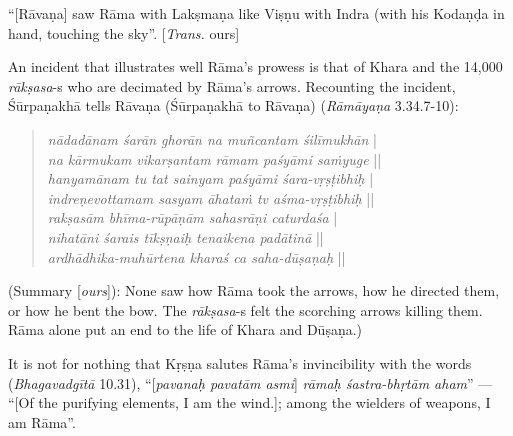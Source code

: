 \begin{myquote}
“[Rāvaṇa] saw Rāma with Lakṣmaṇa like Viṣṇu with Indra (with his Kodaṇḍa in hand, touching the sky”. [{\sl Trans.} ours]
\end{myquote}

An incident that illustrates well Rāma’s prowess is that of Khara and the 14,000 {\sl rākṣasa}-s who are decimated by Rāma’s arrows. Recounting the incident, Śūrpaṇakhā tells Rāvaṇa (Śūrpaṇakhā to Rāvaṇa) ({\sl Rāmāyaṇa} 3.34.7-10): 
\begin{quote}
{{\sl nādadānam śarān ghorān na muñcantam śilīmukhān}} |\\
{\sl na kārmukam vikarṣantam rāmam paśyāmi saṁyuge} ||\\
{\sl hanyamānam tu tat sainyam paśyāmi śara-vṛṣṭibhiḥ} |\\
{\sl indreṇevottamam sasyam āhataṁ tv aśma-vṛṣṭibhiḥ} ||\\
{\sl rakṣasām bhīma-rūpāṇām sahasrāṇi caturdaśa} |\\
{\sl nihatāni śarais tīkṣṇaiḥ tenaikena padātinā} ||\\
{\sl ardhādhika-muhūrtena kharaś ca saha-dūṣaṇaḥ} ||
\end{quote}

\begin{myquote}
(Summary [{\sl ours}]): None saw how Rāma took the arrows, how he directed them, or how he bent the bow. The {\sl rākṣasa}-s felt the scorching arrows killing them. Rāma alone put an end to the life of Khara and Dūṣaṇa.)  
\end{myquote}

It is not for nothing that Kṛṣṇa salutes Rāma’s invincibility with the words ({\sl Bhagavadgītā} 10.31), “[{\sl pavanaḥ pavatām asmi}] {\sl rāmaḥ śastra-bhṛtām aham}” --- “[Of the purifying elements, I am the wind.]; among the wielders of weapons, I am Rāma”. 

